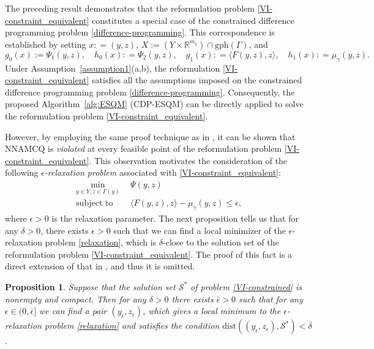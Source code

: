 \documentclass[11pt,a4paper]{article}
\newtheorem{proposition}[theorem]{Proposition}
\theoremstyle{plain}
\begin{document}
The preceding result demonstrates that the reformulation problem \eqref{VI-constraint_equivalent} constitutes a special case of the constrained difference programming problem \eqref{difference-programming}. This correspondence is established by setting $x: = (y,z)$, $X:= (Y \times \mathbb{R}^{m_2}) \cap \mathrm{gph}(\Gamma)$, and
\[
g_0(x):= \Psi_1(y,z), \quad h_0(x): = \Psi_2(y,z), \quad g_1(x): = \langle F(y,z),z\rangle,  \quad h_1(x): = \mu_\gamma(y,z).
\]  
Under Assumption~\ref{assumption1}(a,b), the reformulation \eqref{VI-constraint_equivalent} satisfies all the assumptions imposed on the constrained difference programming problem \eqref{difference-programming}. Consequently, the proposed Algorithm~\ref{alg:ESQM} (CDP-ESQM) can be directly applied to solve the reformulation problem \eqref{VI-constraint_equivalent}.

However, by employing the same proof technique as in \cite[Proposition~7]{ye2021difference}, it can be shown that NNAMCQ is {\em violated} at every feasible point of the reformulation problem \eqref{VI-constraint_equivalent}. This observation motivates the consideration of the following 
{\em $\epsilon$-relaxation problem} associated with \eqref{VI-constraint_equivalent}:
\begin{equation}\label{relaxation}
\begin{aligned}
\min_{ y \in Y, z\in \Gamma(y)}  ~~& 
\Psi(y,z)  \\
\text{subject to } ~~~~& \langle F(y,z),z\rangle - \mu_\gamma(y,z) \le \epsilon,
\end{aligned}
\end{equation}
where $\epsilon> 0$ is the relaxation parameter. The next proposition tells us that for any $\delta > 0$, there exists $\epsilon > 0$ such that we can find a local minimizer of the $\epsilon$-relaxation problem \eqref{relaxation}, which is $\delta$-close to the solution set of the reformulation problem \eqref{VI-constraint_equivalent}. The proof of this fact is a direct extension of that in \cite[Proposition~6]{ye2021difference}, and thus it is omitted.

\begin{proposition}\label{prop:prox}
Suppose that the solution set $\mathcal{S}^*$ of problem \eqref{VI-constrained} is nonempty and compact. Then for any $\delta > 0$ there exists $\bar{\epsilon} > 0$ such that for any $\epsilon \in (0,\bar{\epsilon}]$ we can find a pair $(y_{\epsilon},z_{\epsilon})$, which gives a local minimum to the $\epsilon$-relaxation problem \eqref{relaxation} and satisfies the condition $\mathrm{dist}((y_{\epsilon}, z_{\epsilon}),\mathcal{S}^*) < \delta$.
\end{proposition}
\end{document}

